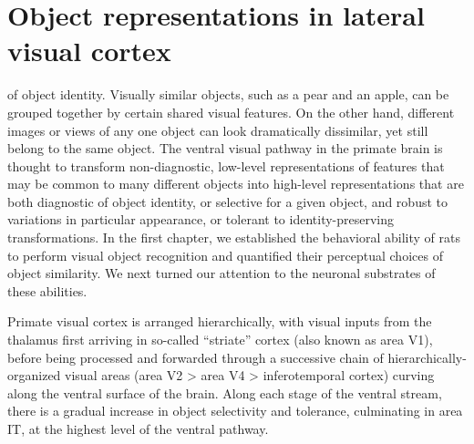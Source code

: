 
\chapter{Object representations in lateral visual cortex}
 of object identity. Visually similar objects, such as a pear and an apple, can be grouped together by certain shared visual features. On the other hand, different images or views of any one object can look dramatically dissimilar, yet still belong to the same object. The ventral visual pathway in the primate brain is thought to transform non-diagnostic, low-level representations of features that may be common to many different objects into high-level representations that are both diagnostic of object identity, or selective for a given object, and robust to variations in particular appearance, or tolerant to identity-preserving transformations. In the first chapter, we established the behavioral ability of rats to perform visual object recognition and quantified their perceptual choices of object similarity. We next turned our attention to the neuronal substrates of these abilities. 

Primate visual cortex is arranged hierarchically, with visual inputs from the thalamus first arriving in so-called ``striate'' cortex (also known as area V1), before being processed and forwarded through a successive chain of hierarchically-organized visual areas (area V2 > area V4 > inferotemporal cortex) curving along the ventral surface of the brain. Along each stage of the ventral stream, there is a gradual increase in object selectivity and tolerance, culminating in area IT, at the highest level of the ventral pathway. 

